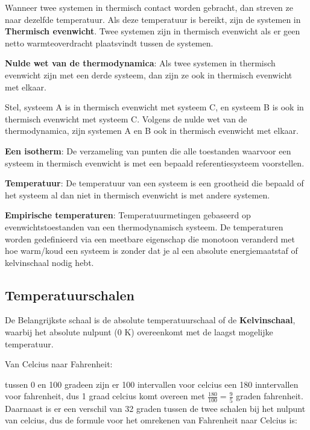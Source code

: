 Wanneer twee systemen in thermisch contact worden gebracht, dan streven ze naar dezelfde temperatuur. Als deze temperatuur is bereikt, zijn de systemen in \textbf{Thermisch evenwicht}.
Twee systemen zijn in thermisch evenwicht als er geen netto warmteoverdracht plaatsvindt tussen de systemen.

\begin{postulate}
\textbf{Nulde wet van de thermodynamica}: Als twee systemen in thermisch evenwicht zijn met een derde systeem, dan zijn ze ook in thermisch evenwicht met elkaar.
\end{postulate}

Stel, systeem A is in thermisch evenwicht met systeem C, en systeem B is ook in thermisch evenwicht met systeem C. Volgens de nulde wet van de thermodynamica, zijn systemen A en B ook in thermisch evenwicht met elkaar.

\begin{definition}
    \textbf{Een isotherm}: De verzameling van punten die alle toestanden waarvoor een systeem in thermisch evenwicht is met een bepaald referentiesysteem voorstellen.
\end{definition}

\begin{definition}
    \textbf{Temperatuur}: De temperatuur van een systeem is een grootheid die bepaald of het systeem al dan niet in thermisch evenwicht is met andere systemen.
\end{definition}

\begin{definition}
    \textbf{Empirische temperaturen}: Temperatuurmetingen gebaseerd op evenwichtstoestanden van een thermodynamisch systeem.
    De temperaturen worden gedefinieerd via een meetbare eigenschap die monotoon veranderd met hoe warm/koud een systeem is zonder dat je al een absolute energiemaatstaf of kelvinschaal nodig hebt.
\end{definition}

\subsection{Temperatuurschalen}

De Belangrijkste schaal is de absolute temperatuurschaal of de \textbf{Kelvinschaal}, waarbij het absolute nulpunt (0 K) overeenkomt met de laagst mogelijke temperatuur.

Van Celcius naar Fahrenheit:

tussen 0 en 100 gradeen zijn er 100 intervallen voor celcius een 180 inntervallen voor fahrenheit, dus 1 graad celcius komt overeen met $\frac{180}{100} = \frac{9}{5}$ graden fahrenheit. Daarnaast is er een verschil van 32 graden tussen de twee schalen bij het nulpunt van celcius, dus de formule voor het omrekenen van Fahrenheit naar Celcius is:

